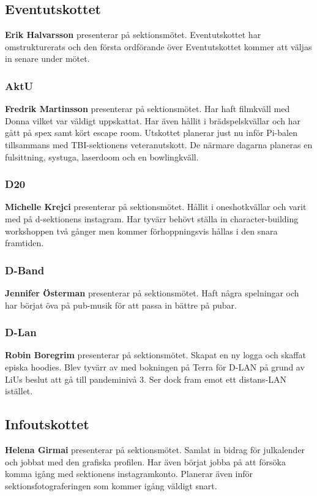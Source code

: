 \documentclass[../protokoll_vintermote_2022.tex]{subfiles}
\begin{document}
\subsection{Eventutskottet}
\textbf{Erik Halvarsson} presenterar på sektionsmötet.
Eventutskottet har omstrukturerats och den första ordförande över Eventutskottet kommer att väljas in senare under mötet.

\subsubsection{AktU}
\textbf{Fredrik Martinsson} presenterar på sektionsmötet.
Har haft filmkväll med Donna vilket var väldigt uppskattat. Har även hållit i brädspelskvällar och har gått på spex samt kört escape room. Utskottet planerar just nu inför Pi-balen tillsammans med TBI-sektionens veteranutskott. De närmare dagarna planeras en fulsittning, systuga, laserdoom och en bowlingkväll.

\subsubsection{D20}
\textbf{Michelle Krejci} presenterar på sektionsmötet.
Hållit i oneshotkvällar och varit med på d-sektionens instagram. Har tyvärr behövt ställa in character-building workshoppen två gånger men kommer förhoppningsvis hållas i den snara framtiden.

\subsubsection{D-Band}
\textbf{Jennifer Österman} presenterar på sektionsmötet.
Haft några spelningar och har börjat öva på pub-musik för att passa in bättre på pubar. 

\subsubsection{D-Lan}
\textbf{Robin Boregrim} presenterar på sektionsmötet.
Skapat en ny logga och skaffat episka hoodies. Blev tyvärr av med bokningen på Terra för D-LAN på grund av LiUs beslut att gå till pandeminivå 3. Ser dock fram emot ett distans-LAN istället.

\subsection{Infoutskottet}
\textbf{Helena Girmai} presenterar på sektionsmötet.
Samlat in bidrag för julkalender och jobbat med den grafiska profilen. Har även börjat jobba på att försöka komma igång med sektionens instagramkonto. Planerar även inför sektionsfotograferingen som kommer igång väldigt snart.
\end{document}
